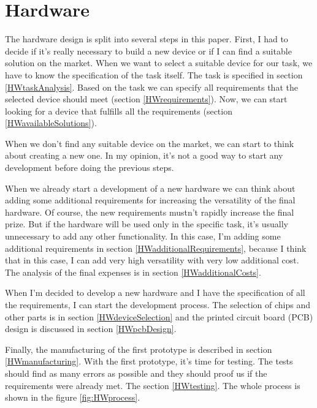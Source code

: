 \chapter{Hardware}
The hardware design is split into several steps in this paper. First, I had to decide if it's really necessary to build a new device or if I can find a suitable solution on the market. When we want to select a suitable device for our task, we have to know the specification of the task itself. The task is specified in section \ref{HWtaskAnalysis}. Based on the task we can specify all requirements that the selected device should meet (section \ref{HWrequirements}). Now, we can start looking for a device that fulfills all the requirements (section \ref{HWavailableSolutions}).

When we don't find any suitable device on the market, we can start to think about creating a new one. In my opinion, it's not a good way to start any development before doing the previous steps.

When we already start a development of a new hardware we can think about adding some additional requirements for increasing the versatility of the final hardware. Of course, the new requirements mustn't rapidly increase the final prize. But if the hardware will be used only in the specific task, it's usually unnecessary to add any other functionality. In this case, I'm adding some additional requirements in section \ref{HWadditionalRequirements}, because I think that in this case, I can add very high versatility with very low additional cost. The analysis of the final expenses is in section \ref{HWadditionalCosts}.

When I'm decided to develop a new hardware and I have the specification of all the requirements, I can start the development process. The selection of chips and other parts is in section \ref{HWdeviceSelection} and the printed circuit board (\ac{PCB}) design is discussed in section \ref{HWpcbDesign}.

Finally, the manufacturing of the first prototype is described in section \ref{HWmanufacturing}. With the first prototype, it's time for testing. The tests should find as many errors as possible and they should proof us if the requirements were already met. The section \ref{HWtesting}. The whole process is shown in the figure \ref{fig:HWprocess}.

